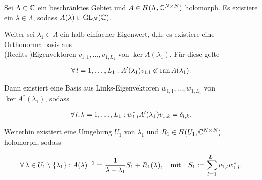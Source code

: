 \begin{theorem} \label{thm:keldysh_nicht_linear}

    Sei $\Lambda \subset \mathbb{C}$ ein beschränktes Gebiet und $A \in H(\Lambda, \mathbb{C}^{N \times N})$ holomorph.
    Es existiere ein $\lambda \in \Lambda$, sodass $A(\lambda) \in \operatorname{GL}_N(\mathbb{C})$.

    Weiter sei $\lambda_1 \in \Lambda$ ein halb-einfacher Eigenwert, d.h. es existiere eine Orthonormalbasis aus \\ (Rechts-)Eigenvektoren $v_{1, 1}, \dots, v_{1, L_1}$ von $\ker A(\lambda_1)$.
    Für diese gelte

    \begin{align} \label{eq:keldysh_nicht_linear_1}
        \forall \, l = 1, \dots, L_1:
            A^\prime(\lambda_1) v_{1, l}
            \not \in
            \operatorname{ran} A(\lambda_1).
    \end{align}

    Dann existiert eine Basis aus Links-Eigenvektoren $w_{1, 1}, \dots, w_{1, L_1}$ von $\ker A^\ast(\lambda_1)$, sodass

    \begin{align} \label{eq:keldysh_nicht_linear_2}
        \forall \, l, k = 1, \dots, L_1:
            w_{1, l}^\ast A^\prime(\lambda_1) v_{1, k} = \delta_{l, k}.
    \end{align}

    Weiterhin existiert eine Umgebung $U_1$ von $\lambda_1$ und $R_1 \in H(U_1, \mathbb{C}^{N \times N})$ holomorph, sodass

    \begin{align} \label{eq:keldysh_nicht_linear_3}
        \forall \, \lambda \in U_1 \setminus {\left \{ \lambda_1 \right \}}:
            A(\lambda)^{-1}
            =
            \frac{1}{\lambda - \lambda_1} S_1
            +
            R_1(\lambda),
            \quad
            \text{mit}
            \quad
            S_1
            :=
            \sum_{l=1}^{L_1}
                v_{1, l} w_{1, l}^\ast.
    \end{align}

\end{theorem}
